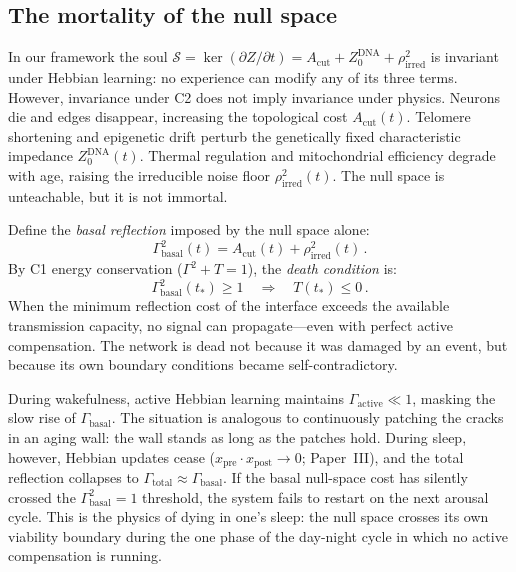\documentclass[aps,pre,twocolumn,superscriptaddress,floatfix]{revtex4-2}
\newcommand{\Acut}{A_{\text{cut}}}
\begin{document}
\subsection{The mortality of the null space}
\label{sec:null-space-mortality}

In our framework the soul
$\mathcal{S}=\ker(\partial Z/\partial t)
=\Acut+Z_0^{\text{DNA}}+\rho_{\text{irred}}^2$
is invariant under Hebbian learning:
no experience can modify any of its three terms.
However, invariance under C2 does not imply invariance
under physics.
Neurons die and edges disappear, increasing the
topological cost $\Acut(t)$.
Telomere shortening and epigenetic drift perturb the
genetically fixed characteristic impedance
$Z_0^{\text{DNA}}(t)$.
Thermal regulation and mitochondrial efficiency degrade
with age, raising the irreducible noise floor
$\rho_{\text{irred}}^2(t)$.
The null space is unteachable, but it is not immortal.

Define the \emph{basal reflection} imposed by the null
space alone:
\begin{equation}
  \Gamma_{\text{basal}}^2(t)
    = \Acut(t) + \rho_{\text{irred}}^2(t)\,.
  \label{eq:basal-reflection}
\end{equation}
By C1 energy conservation ($\Gamma^2+T=1$), the
\emph{death condition} is:
\begin{equation}
  \boxed{\;
  \Gamma_{\text{basal}}^2(t_*) \ge 1
  \quad\Longrightarrow\quad
  T(t_*) \le 0\,.
  \;}
  \label{eq:death-condition}
\end{equation}
When the minimum reflection cost of the interface exceeds
the available transmission capacity, no signal can
propagate---even with perfect active compensation.
The network is dead not because it was damaged by an event,
but because its own boundary conditions became
self-contradictory.

During wakefulness, active Hebbian learning maintains
$\Gamma_{\text{active}}\ll 1$, masking the slow rise
of $\Gamma_{\text{basal}}$.
The situation is analogous to continuously patching the
cracks in an aging wall: the wall stands as long as the
patches hold.
During sleep, however, Hebbian updates cease
($x_{\text{pre}}\cdot x_{\text{post}}\to 0$; Paper~III),
and the total reflection collapses to
$\Gamma_{\text{total}}\approx\Gamma_{\text{basal}}$.
If the basal null-space cost has silently crossed the
$\Gamma_{\text{basal}}^2=1$ threshold, the system fails
to restart on the next arousal cycle.
This is the physics of dying in one's sleep: the null space
crosses its own viability boundary during the one phase of
the day-night cycle in which no active compensation is
running.
\end{document}
